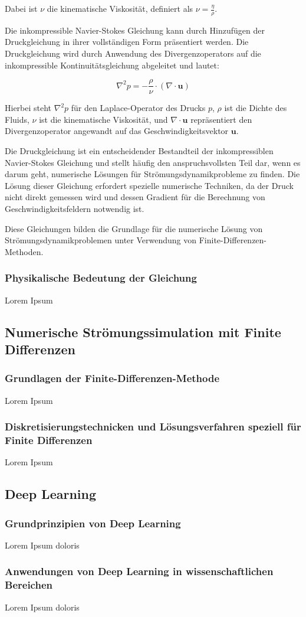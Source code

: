 Dabei ist $\nu$ die kinematische Viskosität, definiert als $\nu = \frac{\eta}{\rho}$.

Die inkompressible Navier-Stokes Gleichung kann durch Hinzufügen der Druckgleichung in ihrer vollständigen Form präsentiert werden. Die Druckgleichung wird durch Anwendung des Divergenzoperators auf die inkompressible Kontinuitätsgleichung abgeleitet und lautet:

\begin{equation}
\nabla^2 p = -\frac{\rho}{\nu} \cdot \left(\nabla \cdot \mathbf{u} \right)
\end{equation}

Hierbei steht $\nabla^2 p$ für den Laplace-Operator des Drucks $p$, $\rho$ ist die Dichte des Fluids, $\nu$ ist die kinematische Viskosität, und $\nabla \cdot \mathbf{u}$ repräsentiert den Divergenzoperator angewandt auf das Geschwindigkeitsvektor $\mathbf{u}$.

Die Druckgleichung ist ein entscheidender Bestandteil der inkompressiblen Navier-Stokes Gleichung und stellt häufig den anspruchsvollsten Teil dar, wenn es darum geht, numerische Lösungen für Strömungsdynamikprobleme zu finden. Die Lösung dieser Gleichung erfordert spezielle numerische Techniken, da der Druck nicht direkt gemessen wird und dessen Gradient für die Berechnung von Geschwindigkeitsfeldern notwendig ist.

Diese Gleichungen bilden die Grundlage für die numerische Lösung von Strömungsdynamikproblemen unter Verwendung von Finite-Differenzen-Methoden. 

\subsubsection{Physikalische Bedeutung der Gleichung}
Lorem Ipsum

\subsection{Numerische Strömungssimulation mit Finite Differenzen}
\subsubsection{Grundlagen der Finite-Differenzen-Methode} 
Lorem Ipsum

\subsubsection{Diskretisierungstechnicken und Lösungsverfahren speziell für Finite Differenzen} 
Lorem Ipsum

\subsection{Deep Learning}
\subsubsection{Grundprinzipien von Deep Learning} 
Lorem Ipsum doloris

\subsubsection{Anwendungen von Deep Learning in wissenschaftlichen Bereichen} Lorem Ipsum doloris